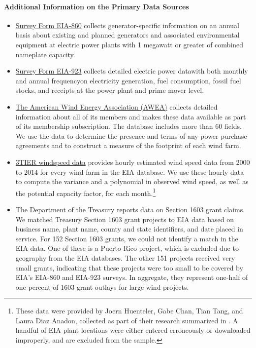 \documentclass[12pt]{article}
\begin{document}
\paragraph{Additional Information on the Primary Data Sources }
\begin{itemize}
\item \href{https://www.eia.gov/electricity/data/eia860/}{Survey Form EIA-860} collects generator-specific information on an annual basis about existing and planned generators and associated environmental equipment at electric power plants with 1 megawatt or greater of combined nameplate capacity.
\item \href{https://www.eia.gov/electricity/data/eia923/}{Survey Form EIA-923} collects detailed electric power data\textemdash with both monthly and annual frequency\textemdash on electricity generation, fuel consumption, fossil fuel stocks, and receipts at the power plant and prime mover level.
\item \href{https://www.awea.org/windiq}{The American Wind Energy Association (AWEA)} collects detailed information about all of its members and makes these data available as part of its membership subscription. The database includes more than 60 fields. We use the data to determine the presence and terms of any power purchase agreements and to construct a measure of the footprint of each wind farm.
\item \href{https://www.vaisala.com/en/industries-innovation/renewable-energy-and-weather}{3TIER windspeed data} provides hourly estimated wind speed data from 2000 to 2014 for every wind farm in the EIA database. We use these hourly data to compute the variance and a polynomial in observed wind speed, as well as the potential capacity factor, for each month.\footnote{These data were provided by Joern Huenteler, Gabe Chan, Tian Tang, and Laura Diaz Anadon, collected as part of their research summarized in \citet{huenteler_why_2018}. A handful of EIA plant locations were either entered erroneously or downloaded improperly, and are excluded from the sample.}
\item \href{https://www.treasury.gov/initiatives/recovery/Pages/1603.aspx}{The Department of the Treasury} reports data on Section 1603 grant claims. We matched Treasury Section 1603 grant projects to EIA data based on business name, plant name, county and state identifiers, and date placed in service. For 152 Section 1603 grants, we could not identify a match in the EIA data. One of these is a Puerto Rico project, which is excluded due to geography from the EIA databases. The other 151 projects received very small grants, indicating that these projects were too small to be covered by EIA's EIA-860 and EIA-923 surveys. In aggregate, they represent one-half of one percent of 1603 grant outlays for large wind projects. 


\end{itemize}
\end{document}
